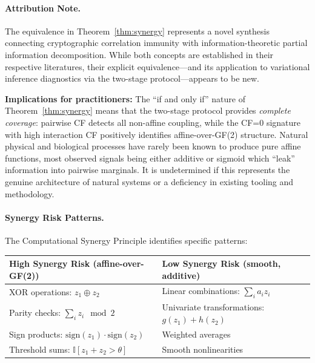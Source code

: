 \documentclass[10pt]{article} %
\theoremstyle{plain}
\theoremstyle{definition}
\begin{document}
\paragraph{Attribution Note.} The equivalence in Theorem~\ref{thm:synergy} represents a novel synthesis connecting cryptographic correlation immunity \citep{siegenthaler1984correlation} with information-theoretic partial information decomposition. While both concepts are established in their respective literatures, their explicit equivalence---and its application to variational inference diagnostics via the two-stage protocol---appears to be new.

\textbf{Implications for practitioners:} The ``if and only if'' nature of Theorem~\ref{thm:synergy} means that the two-stage protocol provides \emph{complete coverage}: pairwise CF detects all non-affine coupling, while the CF=0 signature with high interaction CF positively identifies affine-over-GF(2) structure. Natural physical and biological processes have rarely been known to produce pure affine functions, most observed signals being either additive or sigmoid which ``leak'' information into pairwise marginals. It is undetermined if this represents the genuine architecture of natural systems or a deficiency in existing tooling and methodology.

\paragraph{Synergy Risk Patterns.} The Computational Synergy Principle identifies specific patterns:

\begin{center}
\begin{tabular}{p{}p{}}
\toprule
\textbf{High Synergy Risk} (affine-over-GF(2)) & \textbf{Low Synergy Risk} (smooth, additive) \\
\midrule
XOR operations: $z_1 \oplus z_2$ & Linear combinations: $\sum_i a_i z_i$ \\
Parity checks: $\sum_i z_i \mod 2$ & Univariate transformations: $g(z_1) + h(z_2)$ \\
Sign products: $\text{sign}(z_1) \cdot \text{sign}(z_2)$ & Weighted averages \\
Threshold sums: $\mathbb{I}[z_1 + z_2 > \theta]$ & Smooth nonlinearities \\
\bottomrule
\end{tabular}
\end{center}
\end{document}
